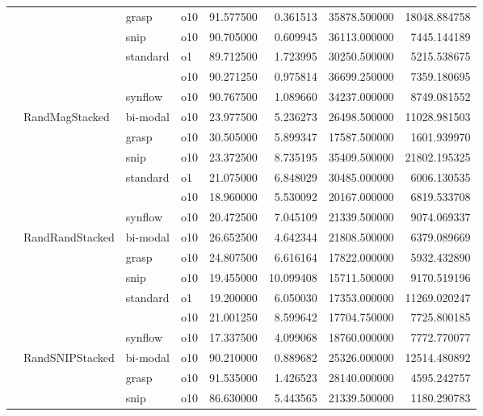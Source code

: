 \begin{longtable}{llllrrrr}
      &     & grasp & o10 &  91.577500 &   0.361513 &     35878.500000 &  18048.884758 \\
      &     & snip & o10 &  90.705000 &   0.609945 &     36113.000000 &   7445.144189 \\
      &     & standard & o1 &  89.712500 &   1.723995 &     30250.500000 &   5215.538675 \\
      &     &         & o10 &  90.271250 &   0.975814 &     36699.250000 &   7359.180695 \\
      &     & synflow & o10 &  90.767500 &   1.089660 &     34237.000000 &   8749.081552 \\
      & RandMagStacked & bi-modal & o10 &  23.977500 &   5.236273 &     26498.500000 &  11028.981503 \\
      &     & grasp & o10 &  30.505000 &   5.899347 &     17587.500000 &   1601.939970 \\
      &     & snip & o10 &  23.372500 &   8.735195 &     35409.500000 &  21802.195325 \\
      &     & standard & o1 &  21.075000 &   6.848029 &     30485.000000 &   6006.130535 \\
      &     &         & o10 &  18.960000 &   5.530092 &     20167.000000 &   6819.533708 \\
      &     & synflow & o10 &  20.472500 &   7.045109 &     21339.500000 &   9074.069337 \\
      & RandRandStacked & bi-modal & o10 &  26.652500 &   4.642344 &     21808.500000 &   6379.089669 \\
      &     & grasp & o10 &  24.807500 &   6.616164 &     17822.000000 &   5932.432890 \\
      &     & snip & o10 &  19.455000 &  10.099408 &     15711.500000 &   9170.519196 \\
      &     & standard & o1 &  19.200000 &   6.050030 &     17353.000000 &  11269.020247 \\
      &     &         & o10 &  21.001250 &   8.599642 &     17704.750000 &   7725.800185 \\
      &     & synflow & o10 &  17.337500 &   4.099068 &     18760.000000 &   7772.770077 \\
      & RandSNIPStacked & bi-modal & o10 &  90.210000 &   0.889682 &     25326.000000 &  12514.480892 \\
      &     & grasp & o10 &  91.535000 &   1.426523 &     28140.000000 &   4595.242757 \\
      &     & snip & o10 &  86.630000 &   5.443565 &     21339.500000 &   1180.290783 \\

\end{longtable}
